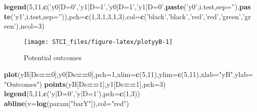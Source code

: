 \documentclass[]{book}
\newenvironment{Shaded}{\begin{snugshade}}{\end{snugshade}}
\newcommand{\KeywordTok}[1]{\textcolor[rgb]{0.13,0.29,0.53}{\textbf{#1}}}
\newcommand{\DataTypeTok}[1]{\textcolor[rgb]{0.13,0.29,0.53}{#1}}
\newcommand{\DecValTok}[1]{\textcolor[rgb]{0.00,0.00,0.81}{#1}}
\newcommand{\StringTok}[1]{\textcolor[rgb]{0.31,0.60,0.02}{#1}}
\newcommand{\OperatorTok}[1]{\textcolor[rgb]{0.81,0.36,0.00}{\textbf{#1}}}
\newcommand{\NormalTok}[1]{#1}
\theoremstyle{definition}
\theoremstyle{definition}
\theoremstyle{definition}
\theoremstyle{remark}
\begin{document}
\begin{Shaded}
\begin{Highlighting}[]
\KeywordTok{legend}\NormalTok{(}\DecValTok{5}\NormalTok{,}\DecValTok{11}\NormalTok{,}\KeywordTok{c}\NormalTok{(}\StringTok{'y0|D=0'}\NormalTok{,}\StringTok{'y1|D=1'}\NormalTok{,}\StringTok{'y0|D=1'}\NormalTok{,}\StringTok{'y1|D=0'}\NormalTok{,}\KeywordTok{paste}\NormalTok{(}\StringTok{'y0'}\NormalTok{,i.test,}\DataTypeTok{sep=}\StringTok{''}\NormalTok{),}\KeywordTok{paste}\NormalTok{(}\StringTok{'y1'}\NormalTok{,i.test,}\DataTypeTok{sep=}\StringTok{''}\NormalTok{)),}\DataTypeTok{pch=}\KeywordTok{c}\NormalTok{(}\DecValTok{1}\NormalTok{,}\DecValTok{3}\NormalTok{,}\DecValTok{1}\NormalTok{,}\DecValTok{3}\NormalTok{,}\DecValTok{1}\NormalTok{,}\DecValTok{3}\NormalTok{),}\DataTypeTok{col=}\KeywordTok{c}\NormalTok{(}\StringTok{'black'}\NormalTok{,}\StringTok{'black'}\NormalTok{,}\StringTok{'red'}\NormalTok{,}\StringTok{'red'}\NormalTok{,}\StringTok{'green'}\NormalTok{,}\StringTok{'green'}\NormalTok{),}\DataTypeTok{ncol=}\DecValTok{3}\NormalTok{)}
\end{Highlighting}
\end{Shaded}

\begin{figure}

{\centering \texttt{[image: STCI\_files/figure-latex/plotyyB-1]} 

}

\caption{Potential outcomes}\label{fig:plotyyB}
\end{figure}

\begin{Shaded}
\begin{Highlighting}[]
\KeywordTok{plot}\NormalTok{(yB[Ds}\OperatorTok{==}\DecValTok{0}\NormalTok{],y0[Ds}\OperatorTok{==}\DecValTok{0}\NormalTok{],}\DataTypeTok{pch=}\DecValTok{1}\NormalTok{,}\DataTypeTok{xlim=}\KeywordTok{c}\NormalTok{(}\DecValTok{5}\NormalTok{,}\DecValTok{11}\NormalTok{),}\DataTypeTok{ylim=}\KeywordTok{c}\NormalTok{(}\DecValTok{5}\NormalTok{,}\DecValTok{11}\NormalTok{),}\DataTypeTok{xlab=}\StringTok{"yB"}\NormalTok{,}\DataTypeTok{ylab=}\StringTok{"Outcomes"}\NormalTok{)}
\KeywordTok{points}\NormalTok{(yB[Ds}\OperatorTok{==}\DecValTok{1}\NormalTok{],y1[Ds}\OperatorTok{==}\DecValTok{1}\NormalTok{],}\DataTypeTok{pch=}\DecValTok{3}\NormalTok{)}
\KeywordTok{legend}\NormalTok{(}\DecValTok{5}\NormalTok{,}\DecValTok{11}\NormalTok{,}\KeywordTok{c}\NormalTok{(}\StringTok{'y|D=0'}\NormalTok{,}\StringTok{'y|D=1'}\NormalTok{),}\DataTypeTok{pch=}\KeywordTok{c}\NormalTok{(}\DecValTok{1}\NormalTok{,}\DecValTok{3}\NormalTok{))}
\KeywordTok{abline}\NormalTok{(}\DataTypeTok{v=}\KeywordTok{log}\NormalTok{(param[}\StringTok{"barY"}\NormalTok{]),}\DataTypeTok{col=}\StringTok{"red"}\NormalTok{)}
\end{Highlighting}
\end{Shaded}
\end{document}
